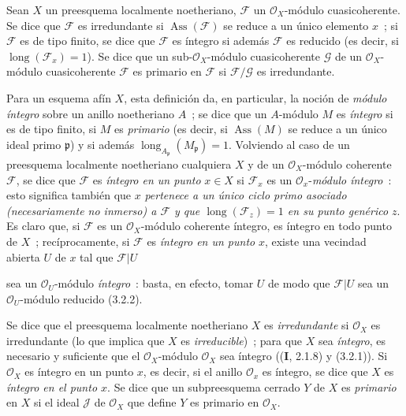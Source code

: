 \begin{definition}[3.2.4]
\label{IV.2.3.2.4-fr}
Sean $X$ un preesquema localmente noetheriano, $\mathcal F$ un
$\mathcal O_X$-módulo cuasicoherente. Se dice que $\mathcal F$ es
irredundante si $\operatorname{Ass}(\mathcal F)$ se reduce a un único
elemento $x$~; si $\mathcal F$ es de tipo finito, se dice que $\mathcal F$ es
íntegro si además $\mathcal F$ es reducido \textup{(es decir, si
$\operatorname{long}(\mathcal F_x)=1$)}. Se dice que un sub-$\mathcal O_X$-módulo
cuasicoherente $\mathcal G$ de un $\mathcal O_X$-módulo cuasicoherente
$\mathcal F$ es primario en $\mathcal F$ si
$\mathcal F/\mathcal G$ es irredundante.
\end{definition}

Para un esquema afín $X$, esta definición da, en particular, la noción de
\emph{módulo íntegro} sobre un anillo noetheriano $A$~; se dice que un
$A$-módulo $M$ es \emph{íntegro} si es de tipo finito, si $M$ es
\emph{primario} (es decir, si $\operatorname{Ass}(M)$ se reduce a un único
ideal primo $\mathfrak p$) y si además
$\operatorname{long}_{A_\mathfrak p}(M_\mathfrak p)=1$. Volviendo al caso de un
preesquema localmente noetheriano cualquiera $X$ y de un
$\mathcal O_X$-módulo coherente $\mathcal F$, se dice que $\mathcal F$ es
\emph{íntegro en un punto} $x\in X$ si $\mathcal F_x$ es un
$\mathcal O_x$-\emph{módulo íntegro}~: esto significa también que $x$
\emph{pertenece a un único ciclo primo asociado (necesariamente no
inmerso) a $\mathcal F$ y que $\operatorname{long}(\mathcal F_z)=1$ en su
punto genérico $z$}. Es claro que, si $\mathcal F$ es un
$\mathcal O_X$-módulo coherente íntegro, es íntegro en todo punto de $X$~;
recíprocamente, si $\mathcal F$ es \emph{íntegro en un punto} $x$, existe una
vecindad abierta $U$ de $x$ tal que $\mathcal F|U$

sea un $\mathcal O_U$-módulo \emph{íntegro}~: basta, en efecto, tomar
$U$ de modo que $\mathcal F|U$ sea un $\mathcal O_U$-módulo reducido (3.2.2).

Se dice que el preesquema localmente noetheriano $X$ es \emph{irredundante} si
$\mathcal O_X$ es irredundante (lo que implica que $X$ es
\emph{irreducible})~; para que $X$ sea \emph{íntegro}, es necesario y suficiente
que el $\mathcal O_X$-módulo $\mathcal O_X$ sea íntegro ((\textbf I, 2.1.8) y
(3.2.1)). Si $\mathcal O_X$ es íntegro en un punto $x$, es decir, si
el anillo $\mathcal O_x$ es íntegro, se dice que $X$ es \emph{íntegro en el
punto $x$}. Se dice que un subpreesquema cerrado $Y$ de $X$ es \emph{primario}
en $X$ si el ideal $\mathcal J$ de $\mathcal O_X$ que define $Y$ es primario
en $\mathcal O_X$.
